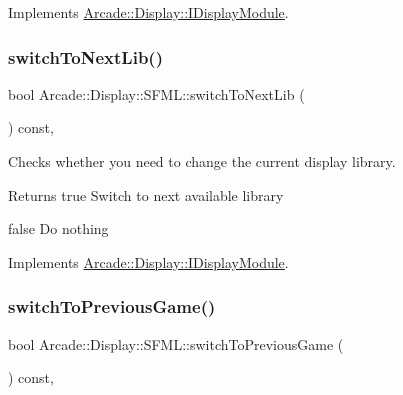 Implements \mbox{\hyperlink{classArcade_1_1Display_1_1IDisplayModule_a9584cb0ca3b157c9a4ec94509e4f8e32}{Arcade\+::\+Display\+::\+I\+Display\+Module}}.

\mbox{\label{classArcade_1_1Display_1_1SFML_a3e7d385aaa46e9137f41e4d78d5e233c}} 
\subsubsection{\texorpdfstring{switchToNextLib()}{switchToNextLib()}}
{\footnotesize\ttfamily bool Arcade\+::\+Display\+::\+S\+F\+M\+L\+::switch\+To\+Next\+Lib (\begin{DoxyParamCaption}{ }\end{DoxyParamCaption}) const\hspace{0.3cm}{\ttfamily [final]}, {\ttfamily [virtual]}}



Checks whether you need to change the current display library. 

\begin{DoxyReturn}{Returns}
true Switch to next available library 

false Do nothing 
\end{DoxyReturn}


Implements \mbox{\hyperlink{classArcade_1_1Display_1_1IDisplayModule_a0de47361c9d47bf8fc52070b945f23b7}{Arcade\+::\+Display\+::\+I\+Display\+Module}}.

\mbox{\label{classArcade_1_1Display_1_1SFML_ae5dbff9dd547fb0a09e478e11bf74c11}} 
\subsubsection{\texorpdfstring{switchToPreviousGame()}{switchToPreviousGame()}}
{\footnotesize\ttfamily bool Arcade\+::\+Display\+::\+S\+F\+M\+L\+::switch\+To\+Previous\+Game (\begin{DoxyParamCaption}{ }\end{DoxyParamCaption}) const\hspace{0.3cm}{\ttfamily [final]}, {\ttfamily [virtual]}}



